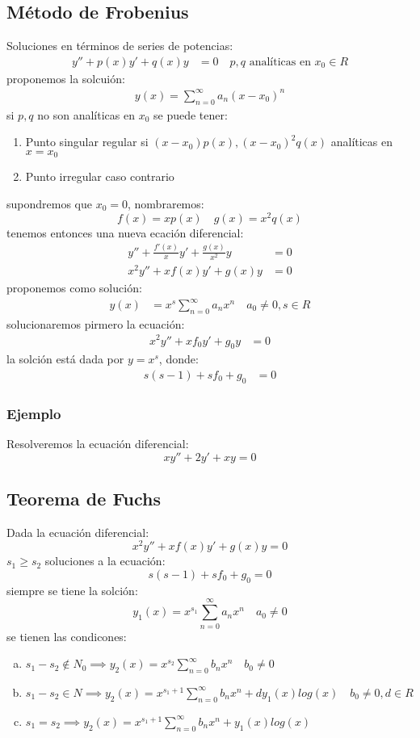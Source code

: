 \documentclass{article}
\begin{document}
\subsection*{Método de Frobenius}
Soluciones en términos de series de potencias:
\begin{align*}
    y'' + p(x)y'+q(x)y &= 0 \quad \text{$p,q$ analíticas en $x_0 \in R$}
\end{align*}
proponemos la solcuión:
\begin{align*}
    y(x) = \sum_{n=0}^\infty a_n(x-x_0)^n
\end{align*}
si $p,q$ no son analíticas en $x_0$ se puede tener:
\begin{enumerate}
    \item Punto singular regular si $(x-x_0)p(x), (x-x_0)^2q(x)$ analíticas en $x=x_0$
    \item Punto irregular caso contrario
\end{enumerate}
supondremos que $x_0=0$, nombraremos:
\[ f(x) = xp(x) \quad g(x)=x^2q(x) \]
tenemos entonces una nueva ecación diferencial:
\begin{align*}
    y''+\frac{f'(x)}{x}y'+\frac{g(x)}{x^2}y &= 0\\
    x^2y'' + xf(x)y'+g(x)y &= 0
\end{align*}
proponemos como solución:
\begin{align*}
    y(x) &= x^s\sum_{n=0}^\infty a_nx^n \quad a_0 \neq 0, s\in R 
\end{align*}
solucionaremos pirmero la ecuación:
\begin{align*}
    x^2y''+xf_0y'+g_0y &= 0
\end{align*}
la solción está dada por $y = x^s$, donde:
\begin{align*}
    s(s-1)+sf_0+g_0 &= 0
\end{align*}

\begin{tcolorbox}[breakable]
    \subsubsection*{Ejemplo}
    Resolveremos la ecuación diferencial:
    \[ xy'' + 2y'+xy = 0\]
\end{tcolorbox}

\subsection*{Teorema de Fuchs}
Dada la ecuación diferencial:
\[ x^2y''+xf(x)y'+g(x)y = 0 \]
$s_1 \geq s_2$ soluciones a la ecuación:
\[ s(s-1) + sf_0 + g_0 = 0 \]
siempre se tiene la solción:
\[ y_1(x) = x^{s_1}\sum_{n=0}^\infty a_nx^n \quad a_0 \neq 0 \]
se tienen las condicones:
\begin{enumerate}[a)]
    \item $s_1-s_2 \notin N_0 \implies y_2(x) = x^{s_2}\sum_{n=0}^\infty b_nx^n \quad b_0 \neq 0$
    \item $s_1-s_2 \in N \implies y_2(x) = x^{s_1+1}\sum_{n=0}^\infty b_nx^n + dy_1(x)log(x) \quad b_0 \neq 0, d \in R$
    \item $s_1=s_2 \implies y_2(x) = x^{s_1+1}\sum_{n=0}^\infty b_nx^n + y_1(x)log(x) $
\end{enumerate}    
\end{document}
